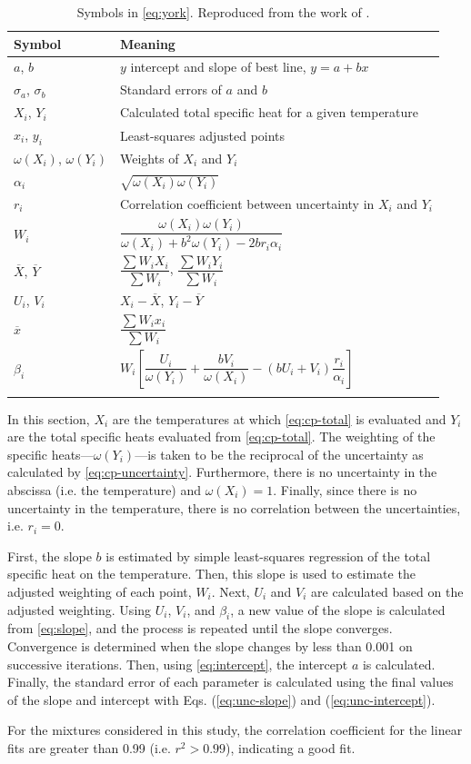 \documentclass[12pt, letterpaper]{article}
\begin{document}
\begin{table}
\centering
\caption{Symbols in \autoref{eq:york}. Reproduced from the work of \textcite{York2004}.}
\label{tab:york-syms}
\begin{tabular}{ll}
\toprule
Symbol & Meaning \\
\midrule
$a$, $b$ & $y$ intercept and slope of best line, $y=a+b x$ \\
$\sigma_a$, $\sigma_b$ & Standard errors of $a$ and $b$ \\
$X_i$, $Y_i$ & Calculated total specific heat for a given temperature \\
$x_i$, $y_i$ & Least-squares adjusted points \\
$\omega(X_i)$, $\omega(Y_i)$ & Weights of $X_i$ and $Y_i$ \\
\addlinespace
$\alpha_i$ & $\sqrt{\omega(X_i)\omega(Y_i)}$ \\
\addlinespace
$r_i$ & Correlation coefficient between uncertainty in $X_i$ and $Y_i$ \\
\addlinespace
$W_i$ & $\dfrac{\omega(X_i)\omega(Y_i)}{\omega(X_i) + b^2\omega(Y_i) - 2br_i\alpha_i}$ \\
\addlinespace
$\overline{X}$, $\overline{Y}$ & $\dfrac{\sum W_i X_i}{\sum W_i}$, $\dfrac{\sum W_i Y_i}{\sum W_i}$ \\
\addlinespace
$U_i$, $V_i$ & $X_i - \overline{X}$, $Y_i - \overline{Y}$ \\
\addlinespace
$\overline{x}$ & $\dfrac{\sum W_i x_i}{\sum W_i}$ \\
\addlinespace
$\beta_i$ & $W_i \left[\dfrac{U_i}{\omega(Y_i)} + \dfrac{bV_i}{\omega(X_i)} - \left(bU_i + V_i\right)\dfrac{r_i}{\alpha_i}\right]$ \\
\addlinespace
\bottomrule
\end{tabular}
\end{table}

In this section, $X_i$ are the temperatures at which \autoref{eq:cp-total}
is evaluated and $Y_i$ are the total specific heats evaluated from \autoref{eq:cp-total}.
The weighting of the specific heats---$\omega(Y_i)$---is taken
to be the reciprocal of the uncertainty as calculated by
\autoref{eq:cp-uncertainty}. Furthermore, there is no uncertainty in the
abscissa (i.e. the temperature) and $\omega(X_i) = 1$. Finally, since there
is no uncertainty in the temperature, there is no correlation between
the uncertainties, i.e. $r_i = 0$.

First, the slope $b$ is estimated by simple least-squares regression of the total
specific heat on the temperature. Then, this slope is used to estimate the
adjusted weighting of each point, $W_i$. Next, $U_i$ and $V_i$ are calculated
based on the adjusted weighting. Using $U_i$, $V_i$, and $\beta_i$, a new value of the
slope is calculated from \autoref{eq:slope}, and the process is repeated until the slope converges.
Convergence is determined when the slope changes by less than 0.001 on successive
iterations. Then, using \autoref{eq:intercept}, the intercept $a$ is calculated.
Finally, the standard error of each parameter is
calculated using the final values of the slope and intercept with Eqs. (\ref{eq:unc-slope})
and (\ref{eq:unc-intercept}).

For the mixtures considered in
this study, the correlation coefficient for the linear fits are greater than
0.99 (i.e. $r^2 > 0.99$), indicating a good fit.
\end{document}
